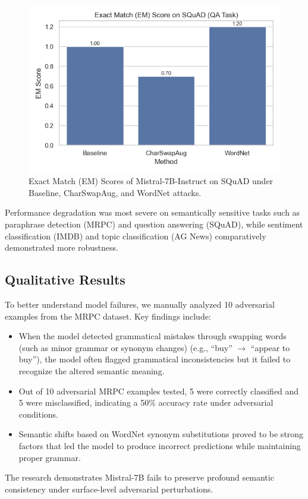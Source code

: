 \documentclass[conference]{IEEEtran}
\begin{document}
\begin{figure}[htbp]
    \centering
    \includegraphics[width=0.65\linewidth]{figures/em_chart_updated.png}
    \caption{Exact Match (EM) Scores of Mistral-7B-Instruct on SQuAD under Baseline, CharSwapAug, and WordNet attacks.}
    \label{fig:em}
\end{figure}

Performance degradation was most severe on semantically sensitive tasks such as paraphrase detection (MRPC) and question answering (SQuAD), while sentiment classification (IMDB) and topic classification (AG News) comparatively demonstrated more robustness.

\subsection{Qualitative Results}

To better understand model failures, we manually analyzed 10 adversarial examples from the MRPC dataset.  
Key findings include:
\begin{itemize}
    \item When the model detected grammatical mistakes through swapping words (such as minor grammar or synonym changes) (e.g., ``buy'' $\rightarrow$ ``appear to buy''), the model often flagged grammatical inconsistencies but it failed to recognize the altered semantic meaning.
    \item Out of 10 adversarial MRPC examples tested, 5 were correctly classified and 5 were misclassified, indicating a 50\% accuracy rate under adversarial conditions.
    \item Semantic shifts based on WordNet synonym substitutions proved to be strong factors that led the model to produce incorrect predictions while maintaining proper grammar.
\end{itemize}


The research demonstrates Mistral-7B fails to preserve profound semantic consistency under surface-level adversarial perturbations.
\end{document}
